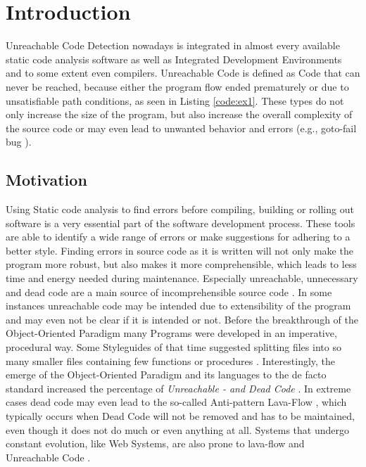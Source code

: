 
\chapter{Introduction}
\label{cha:introduction}

Unreachable Code Detection nowadays is integrated in almost every available static code analysis software as well as Integrated Development Environments and to some extent even compilers.
Unreachable Code is defined as Code that can never be reached, because either the program flow ended prematurely or due to unsatisfiable path conditions, as seen in Listing \ref{code:ex1}.
These types do not only increase the size of the program, but also increase the overall complexity of the source code or may even lead to unwanted behavior and errors (e.g., goto-fail bug \cite{Boyes_2014}).

\section{Motivation}
\label{sec:motivation}
Using Static code analysis to find errors before compiling, building or rolling out software is a very essential part of the software development process.
These tools are able to identify a wide range of errors or make suggestions for adhering to a better style.
Finding errors in source code as it is written will not only make the program more robust, but also makes it more comprehensible, which leads to less time and energy needed during maintenance.
Especially unreachable, unnecessary and dead code are a main source of incomprehensible source code \cite{Romano_2020}.
In some instances unreachable code may be intended due to extensibility of the program \cite{Haas_2020} and may even not be clear if it is intended or not.
Before the breakthrough of the Object-Oriented Paradigm many Programs were developed in an imperative, procedural way. Some Styleguides of that time suggested splitting files into so many smaller files containing few functions or procedures \cite{Srivastava_1992}.
Interestingly, the emerge of the Object-Oriented Paradigm and its languages to the de facto standard increased the percentage of \emph{Unreachable - and Dead Code} \cite{Srivastava_1992}.
In extreme cases dead code may even lead to the so-called Anti-pattern Lava-Flow \cite{Romano_2020}, which typically occurs when Dead Code will not be removed and has to be maintained, even though it does not do much or even anything at all.
Systems that undergo constant evolution, like Web Systems, are also prone to lava-flow and Unreachable Code \cite{Boomsma_2012}.

